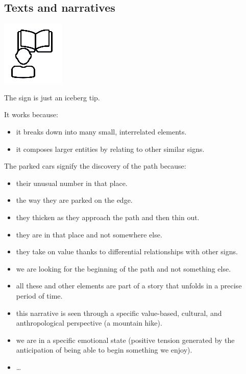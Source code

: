 \subsection{Texts and narratives}\label{texts-and-narratives}

\begin{center}
\includegraphics[scale=0.75]{../img/neuro.png}
\end{center}

The sign is just an iceberg tip.

It works because:

\begin{itemize}
\tightlist
\item it breaks down into many small, interrelated elements.
\item it composes larger entities by relating to other similar signs.
\end{itemize}

The parked cars signify the discovery of the path because:

\begin{itemize}
\tightlist
\item their unusual number in that place.
\item the way they are parked on the edge.
\item they thicken as they approach the path and then thin out.
\item they are in that place and not somewhere else.
\item they take on value thanks to differential relationships with other signs.
\item we are looking for the beginning of the path and not something else.
\item all these and other elements are part of a story that unfolds in a precise period of time.
\item this narrative is seen through a specific value-based, cultural, and anthropological perspective (a mountain hike).
\item we are in a specific emotional state (positive tension generated by the anticipation of being able to begin something we enjoy).
\item
  \ldots{}
\end{itemize}

